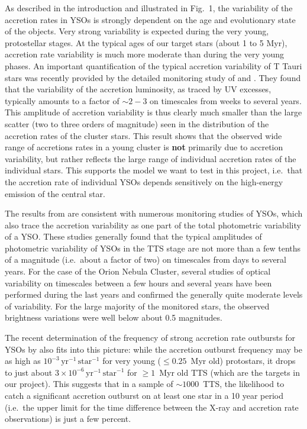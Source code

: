 \documentclass[10pt,fleqn,twoside]{article}
\begin{document}
As described in the introduction and illustrated in Fig.~1,
the variability of the accretion rates in YSOs is strongly dependent
on the age and evolutionary state of the objects.
Very strong variability is expected during the very young, protostellar stages.
%
At the typical ages of our target stars (about 1 to 5 Myr),
accretion rate variability is much more moderate than during the
very young phases.
%
An important quantification of the typical accretion variability of T Tauri stars
was recently
provided by the detailed monitoring study of 
\citet{Venuti14} and \citet{Venuti15}.
 They found that the variability of the accretion luminosity, as traced
by UV excesses, 
typically amounts to a factor of $\sim 2-3$ on timescales
from weeks to several years. This amplitude of accretion variability
is thus clearly much smaller than the large scatter 
(two to three orders of magnitude)
seen in the distribution of the accretion rates of the cluster stars.
This result shows that the observed wide range of accretions rates
in a young cluster is \textbf{not} primarily due to accretion variability, 
but rather reflects the large range of individual accretion rates of 
the individual stars.
This supports the model we want to test in this project, i.e.~that 
the accretion rate of individual YSOs depends sensitively on the high-energy 
emission of the central  star.

The results from \citet{Venuti14} are consistent with numerous monitoring
studies of YSOs, which also trace the accretion variability as one part
of the total photometric variability of a YSO.
%
%
These studies generally found that the typical
amplitudes of photometric variability of YSOs in the TTS stage
are not more than a few tenths of a magnitude (i.e.~about a factor of two)
on timescales from days to several years.
For the case of the Orion Nebula Cluster, several studies of 
optical variability
on timescales between a few hours and several years
have been performed during the last years
\citep{Herbst02,Stassun06,Stassun07,Parihar09,Rice15} and confirmed
the generally quite moderate levels of variability.
For the large majority of the monitored stars, the observed brightness 
variations were well below about 0.5 magnitudes.

The recent determination of the
frequency of strong accretion rate outbursts for YSOs by \citet{HF15}
also fits into this picture:
 while
the accretion outburst frequency may be as high as
 $10^{-3}\,\mathrm{yr}^{-1}\,\mathrm{star}^{-1}$ for very young
($\le 0.25$~Myr old) protostars, it drops to just about
$3 \times 10^{-6}\,\mathrm{yr}^{-1}\,\mathrm{star}^{-1}$ for
$\ge 1$~Myr old TTS (which are the targets in our project).
This suggests that 
in a sample of $\sim 1000$~TTS,
the likelihood to catch a significant accretion outburst
on at least one star in a 10 year period (i.e.~the upper limit for the
time difference between the X-ray and accretion rate observations)
is just a few percent.
\end{document}
